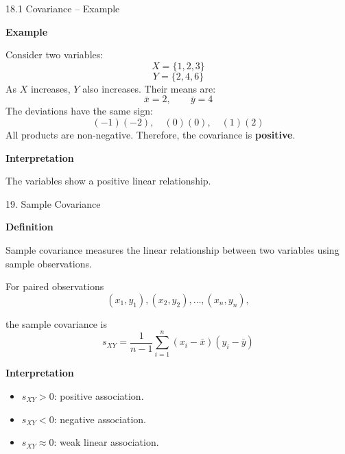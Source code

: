 \begin{frame}{18.1 Covariance -- Example}

\textbf{Example}

Consider two variables:
\[
X=\{1,2,3\}
\]
\[
Y=\{2,4,6\}
\]
As $X$ increases, $Y$ also increases.
Their means are:
\[
\bar{x}=2,\qquad \bar{y}=4
\]
The deviations have the same sign:
\[
(-1)(-2),\quad (0)(0),\quad (1)(2)
\]
All products are non-negative.
Therefore, the covariance is \textbf{positive}.

\textbf{Interpretation}

The variables show a positive linear relationship.

\end{frame}



\begin{frame}{19. Sample Covariance}

\textbf{Definition}

Sample covariance measures the linear relationship between
two variables using sample observations.

\vspace{0.1cm}

For paired observations
\[
(x_1,y_1),(x_2,y_2),\ldots,(x_n,y_n),
\]

the sample covariance is
\[
\boxed{
s_{XY}
=
\frac{1}{n-1}
\sum_{i=1}^{n}
(x_i-\bar{x})(y_i-\bar{y})
}
\]

\vspace{0.1cm}

\textbf{Interpretation}

\begin{itemize}
    \item $s_{XY}>0$: positive association.
    \item $s_{XY}<0$: negative association.
    \item $s_{XY}\approx0$: weak linear association.
\end{itemize}

\end{frame}


